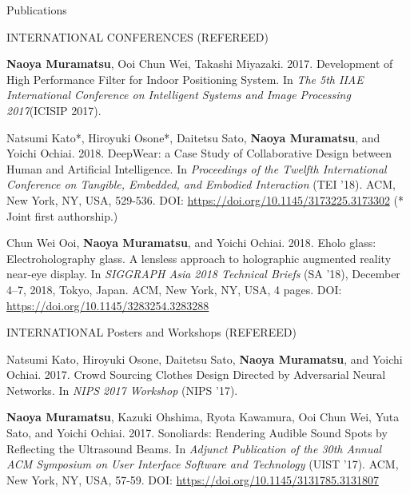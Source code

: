 \documentclass{resume} %
\begin{document}
\begin{rSection}{Publications} \itemsep 4pt



    \begin{rSubsection}{INTERNATIONAL CONFERENCES (REFEREED)}{}{}{}{}
        \item \textbf{Naoya Muramatsu}, Ooi Chun Wei, Takashi Miyazaki. 2017. Development of High Performance Filter for Indoor Positioning System. In \textit{The 5th IIAE International Conference on Intelligent Systems and Image Processing 2017}(ICISIP 2017).

        \item Natsumi Kato*, Hiroyuki Osone*, Daitetsu Sato, \textbf{Naoya Muramatsu}, and Yoichi Ochiai. 2018. DeepWear: a Case Study of Collaborative Design between Human and Artificial Intelligence. In \textit{Proceedings of the Twelfth International Conference on Tangible, Embedded, and Embodied Interaction} (TEI ’18). ACM, New York, NY, USA, 529-536. DOI: \url{https://doi.org/10.1145/3173225.3173302} (* Joint first authorship.)


        \item Chun Wei Ooi, \textbf{Naoya Muramatsu}, and Yoichi Ochiai. 2018. Eholo glass: Electroholography glass. A lensless approach to holographic augmented reality near-eye display. In \textit{SIGGRAPH Asia 2018 Technical Briefs} (SA ’18), December 4–7, 2018, Tokyo, Japan. ACM, New York, NY, USA, 4 pages. DOI: \url{https://doi.org/10.1145/3283254.3283288}
    \end{rSubsection}

    \begin{rSubsection}{INTERNATIONAL Posters and Workshops (REFEREED)}{}{}{}{}
        \item Natsumi Kato, Hiroyuki Osone, Daitetsu Sato, \textbf{Naoya Muramatsu}, and Yoichi Ochiai. 2017. Crowd Sourcing Clothes Design Directed by Adversarial Neural Networks. In \textit{NIPS 2017 Workshop} (NIPS ’17).

        \item \textbf{Naoya Muramatsu}, Kazuki Ohshima, Ryota Kawamura, Ooi Chun Wei, Yuta Sato, and Yoichi Ochiai. 2017. Sonoliards: Rendering Audible Sound Spots by Reflecting the Ultrasound Beams. In \textit{Adjunct Publication of the 30th Annual ACM Symposium on User Interface Software and Technology} (UIST ’17). ACM, New York, NY, USA, 57-59. DOI: \url{https://doi.org/10.1145/3131785.3131807}


\end{rSubsection}
\end{rSection}
\end{document}
